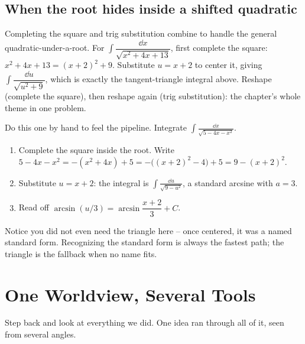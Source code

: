 \subsection{When the root hides inside a shifted quadratic}

Completing the square and trig substitution combine to handle the general
quadratic-under-a-root. For $\int \dfrac{\dd x}{\sqrt{x^2 + 4x + 13}}$, first
complete the square: $x^2 + 4x + 13 = (x+2)^2 + 9$. Substitute $u = x+2$ to
center it, giving $\int \dfrac{\dd u}{\sqrt{u^2 + 9}}$, which is exactly the
tangent-triangle integral above. Reshape (complete the square), then reshape
again (trig substitution): the chapter's whole theme in one problem.

\begin{labbox}
Do this one by hand to feel the pipeline. Integrate
$\displaystyle \int \frac{\dd x}{\sqrt{5 - 4x - x^2}}.$
\begin{enumerate}
\item Complete the square inside the root. Write $5 - 4x - x^2 =
   -(x^2 + 4x) + 5 = -\big((x+2)^2 - 4\big) + 5 = 9 - (x+2)^2$.
\item Substitute $u = x+2$: the integral is $\displaystyle\int
   \frac{\dd u}{\sqrt{9 - u^2}}$, a standard arcsine with $a = 3$.
\item Read off $\arcsin(u/3) = \arcsin\!\dfrac{x+2}{3} + C$.
\end{enumerate}
Notice you did not even need the triangle here -- once centered, it was a
named standard form. Recognizing the standard form is always the fastest path;
the triangle is the fallback when no name fits.
\end{labbox}

\section{One Worldview, Several Tools}
\label{ch24:synthesis}

Step back and look at everything we did. One idea ran through all of it,
seen from several angles.

